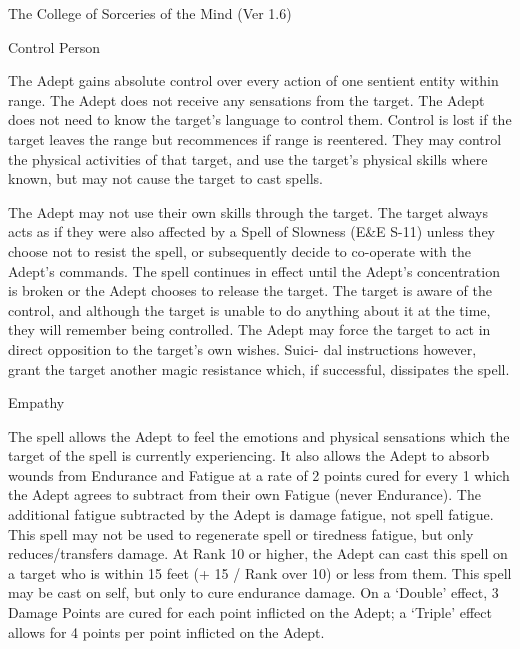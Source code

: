 \begin{Chapter}{The College of Sorceries of the Mind (Ver 1.6)}
\begin{spell}[G-2]{Control Person }

\begin{effects}
The Adept gains absolute control over every action of one sentient
entity within range.  The Adept does not receive any sensations from
the target.  The Adept does not need to know the target’s language to
control them. Control is lost if the target leaves the range but
recommences if range is reentered.  They may control the physical
activities of that target, and use the target’s physical skills where
known, but may not cause the target to cast spells.

The Adept may not use their own skills through the target.  The target
always acts as if they were also affected by a Spell of Slowness (E\&E
S-11) unless they choose not to resist the spell, or subsequently
decide to co-operate with the Adept’s commands.  The spell continues
in effect until the Adept’s concentration is broken or the Adept
chooses to release the target.  The target is aware of the control,
and although the target is unable to do anything about it at the time,
they will remember being controlled. The Adept may force the target to
act in direct opposition to the target’s own wishes. Suici- dal
instructions however, grant the target another magic resistance which,
if successful, dissipates the spell.
\end{effects}
\end{spell}

\begin{spell}[G-3]{Empathy }

\begin{effects}
The spell allows the Adept to feel the emotions and physical
sensations which the target of the spell is currently experiencing. It
also allows the Adept to absorb wounds from Endurance and Fatigue at a
rate of 2 points cured for every 1 which the Adept agrees to subtract
from their own Fatigue (never Endurance).  The additional fatigue
subtracted by the Adept is damage fatigue, not spell fatigue. This
spell may not be used to regenerate spell or tiredness fatigue, but
only reduces/transfers damage. At Rank 10 or higher, the Adept can
cast this spell on a target who is within 15 feet (+ 15 / Rank over
10) or less from them.  This spell may be cast on self, but only to
cure endurance damage.  On a ‘Double’ effect, 3 Damage Points are
cured for each point inflicted on the Adept; a ‘Triple’ effect allows
for 4 points per point inflicted on the Adept.
\end{effects}
\end{spell}


\end{Chapter}
